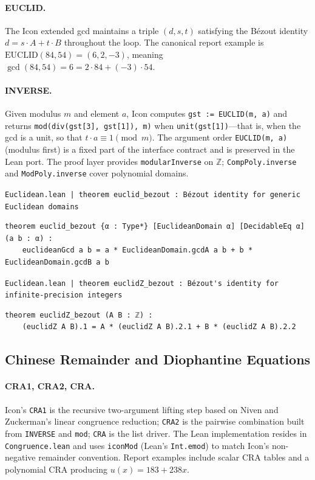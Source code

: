 \documentclass[11pt,a4paper]{article}
\begin{document}
\paragraph{EUCLID.} The Icon extended gcd maintains a triple $(d, s, t)$ satisfying the Bézout identity $d = s \cdot A + t \cdot B$ throughout the loop. The canonical report example is $\mathrm{EUCLID}(84, 54) = (6, 2, -3)$, meaning $\gcd(84, 54) = 6 = 2 \cdot 84 + (-3) \cdot 54$.

\paragraph{INVERSE.} Given modulus $m$ and element $a$, Icon computes \texttt{gst := EUCLID(m, a)} and returns \texttt{mod(div(gst[3], gst[1]), m)} when \texttt{unit(gst[1])}---that is, when the gcd is a unit, so that $t \cdot a \equiv 1 \pmod{m}$. The argument order \texttt{EUCLID(m, a)} (modulus first) is a fixed part of the interface contract and is preserved in the Lean port. The proof layer provides \texttt{modularInverse} on $\mathbb{Z}$; \texttt{CompPoly.inverse} and \texttt{ModPoly.inverse} cover polynomial domains.

\begin{leancertbox}
\lstinline[style=leanbox]{Euclidean.lean | theorem euclid_bezout : Bézout identity for generic Euclidean domains}
\begin{lstlisting}[style=leanbox]
theorem euclid_bezout {α : Type*} [EuclideanDomain α] [DecidableEq α] (a b : α) :
    euclideanGcd a b = a * EuclideanDomain.gcdA a b + b * EuclideanDomain.gcdB a b
\end{lstlisting}
\end{leancertbox}

\begin{leancertbox}
\lstinline[style=leanbox]{Euclidean.lean | theorem euclidZ_bezout : Bézout's identity for infinite-precision integers}
\begin{lstlisting}[style=leanbox]
theorem euclidZ_bezout (A B : ℤ) :
    (euclidZ A B).1 = A * (euclidZ A B).2.1 + B * (euclidZ A B).2.2
\end{lstlisting}
\end{leancertbox}

\subsection{Chinese Remainder and Diophantine Equations}
\paragraph{CRA1, CRA2, CRA.} Icon's \texttt{CRA1} is the recursive two-argument lifting step based on Niven and Zuckerman’s linear congruence reduction; \texttt{CRA2} is the pairwise combination built from \texttt{INVERSE} and \texttt{mod}; \texttt{CRA} is the list driver. The Lean implementation resides in \texttt{Congruence.lean} and uses \texttt{iconMod} (Lean's \texttt{Int.emod}) to match Icon's non-negative remainder convention. Report examples include scalar CRA tables and a polynomial CRA producing $u(x) = 183 + 238x$.
\end{document}
